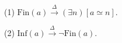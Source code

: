 (1) $\text{Fin}(a) \overset{\Delta}{\rightarrow} (\exists n)[a \simeq n]$.

(2) $\text{Inf}(a) \overset{\Delta}{\rightarrow} \neg \text{Fin}(a)$.
